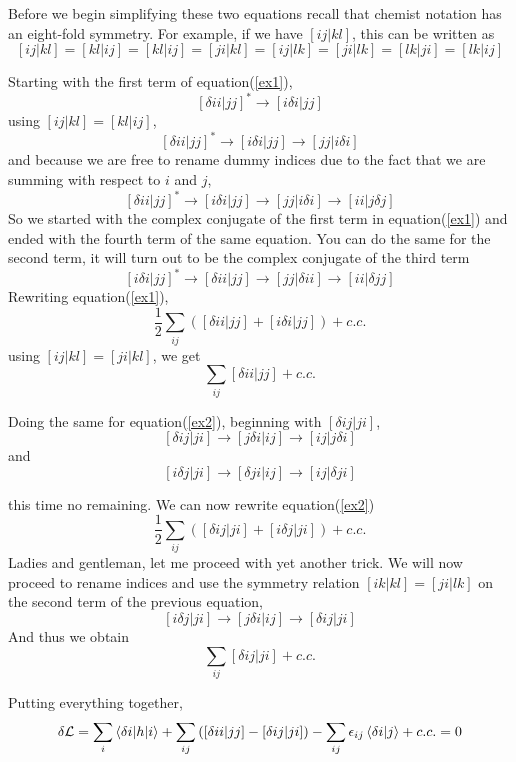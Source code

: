 \documentclass[a4paper]{article}
\begin{document}
Before we begin simplifying these two equations recall that chemist notation has an eight-fold symmetry.
For example, if we have $[ij|kl]$, this can be written as
$$
[ij|kl] = [kl|ij] = [kl|ij] = [ji|kl] = [ij|lk] = [ji|lk] = [lk|ji] = [lk|ij]
$$

Starting with the first term of equation(\ref{ex1}),
$$
[\delta i i | jj]^* \rightarrow [i\delta i | jj] 
$$
using $[ij|kl] = [kl|ij]$,
$$
[\delta i i | jj]^* \rightarrow [i\delta i | jj] \rightarrow [jj | i\delta i]  
$$
and because we are free to rename dummy indices due to the fact that we are summing with respect to $i$ and $j$,
$$
[\delta i i | jj]^* \rightarrow [i\delta i | jj] \rightarrow [jj | i\delta i]  \rightarrow [ii| j\delta j]
$$
So we started with the complex conjugate of the first term in equation(\ref{ex1}) and ended with the fourth term of the same equation.
You can do the same for the second term, it will turn out to be the complex conjugate of the third term
$$
[i \delta i | jj]^* \rightarrow [\delta i i|jj] \rightarrow [jj|\delta ii] \rightarrow [ii|\delta jj]
$$
Rewriting equation(\ref{ex1}),
\begin{equation}
\frac{1}{2}\sum_{ij} \left( [\delta i i | jj] + [i \delta i | jj]\right) + c.c.
\end{equation}
using $[ij|kl] = [ji|kl]$, we get
\begin{equation}
\sum_{ij} [\delta i i | jj]  + c.c.
\end{equation}

Doing the same for equation(\ref{ex2}), beginning with $[\delta i j | ji]$,
$$
[\delta i j | ji] \rightarrow [j\delta i|ij] \rightarrow [ij|j\delta i] 
$$
and
$$
[i \delta j | ji] \rightarrow [\delta j i| ij] \rightarrow [ij|\delta j i] 
$$

this time no remaining. We can now rewrite equation(\ref{ex2})
$$
\frac{1}{2}\sum_{ij} \left( [\delta i j | ji] + [i \delta j | ji]\right) + c.c.
$$
Ladies and gentleman, let me proceed with yet another trick.
We will now proceed to rename indices and use the symmetry relation $[ik|kl] = [ji|lk]$ on the second term of the previous equation,
$$
[i \delta j | ji] \rightarrow [j \delta i | ij] \rightarrow [\delta ij|ji]
$$
And thus we obtain
\begin{equation}
\sum_{ij}  [\delta i j | ji]  + c.c.
\end{equation}

Putting everything together,
\begin{equation} \label{hf-full}
\delta \mathcal{L} = \sum_i \braket{\delta i|h|i} + \sum_{ij} \left([\delta i i | jj] - [\delta i j | ji]\right) - \sum_{ij} \epsilon_{ij} \braket{\delta i|j} + c.c. = 0
\end{equation}
\end{document}
